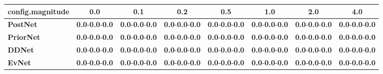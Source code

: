 \begin{tabular}{lccccccc}
\toprule
\textbf{config.magnitude} &                                     0.0 &                                     0.1 &                                     0.2 &                                     0.5 &                                     1.0 &                                     2.0 &                                     4.0 \\
\midrule
\textbf{PostNet } &  \textbf{0.0}-\textbf{0.0}-\textbf{0.0} &  \textbf{0.0}-\textbf{0.0}-\textbf{0.0} &  \textbf{0.0}-\textbf{0.0}-\textbf{0.0} &  \textbf{0.0}-\textbf{0.0}-\textbf{0.0} &  \textbf{0.0}-\textbf{0.0}-\textbf{0.0} &  \textbf{0.0}-\textbf{0.0}-\textbf{0.0} &  \textbf{0.0}-\textbf{0.0}-\textbf{0.0} \\
\textbf{PriorNet} &  \textbf{0.0}-\textbf{0.0}-\textbf{0.0} &  \textbf{0.0}-\textbf{0.0}-\textbf{0.0} &  \textbf{0.0}-\textbf{0.0}-\textbf{0.0} &  \textbf{0.0}-\textbf{0.0}-\textbf{0.0} &  \textbf{0.0}-\textbf{0.0}-\textbf{0.0} &  \textbf{0.0}-\textbf{0.0}-\textbf{0.0} &  \textbf{0.0}-\textbf{0.0}-\textbf{0.0} \\
\textbf{DDNet   } &  \textbf{0.0}-\textbf{0.0}-\textbf{0.0} &  \textbf{0.0}-\textbf{0.0}-\textbf{0.0} &  \textbf{0.0}-\textbf{0.0}-\textbf{0.0} &  \textbf{0.0}-\textbf{0.0}-\textbf{0.0} &  \textbf{0.0}-\textbf{0.0}-\textbf{0.0} &  \textbf{0.0}-\textbf{0.0}-\textbf{0.0} &  \textbf{0.0}-\textbf{0.0}-\textbf{0.0} \\
\textbf{EvNet   } &  \textbf{0.0}-\textbf{0.0}-\textbf{0.0} &  \textbf{0.0}-\textbf{0.0}-\textbf{0.0} &  \textbf{0.0}-\textbf{0.0}-\textbf{0.0} &  \textbf{0.0}-\textbf{0.0}-\textbf{0.0} &  \textbf{0.0}-\textbf{0.0}-\textbf{0.0} &  \textbf{0.0}-\textbf{0.0}-\textbf{0.0} &  \textbf{0.0}-\textbf{0.0}-\textbf{0.0} \\
\bottomrule
\end{tabular}
